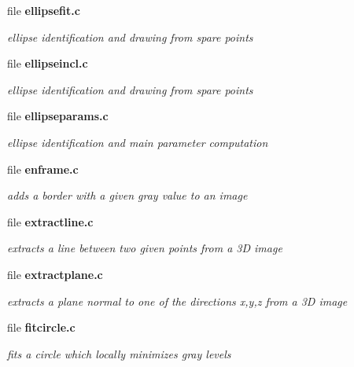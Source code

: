 \begin{CompactItemize}
\item 
file {\bf ellipsefit.c}
\begin{CompactList}\small\item\em ellipse identification and drawing from spare points \item\end{CompactList}

\item 
file {\bf ellipseincl.c}
\begin{CompactList}\small\item\em ellipse identification and drawing from spare points \item\end{CompactList}

\item 
file {\bf ellipseparams.c}
\begin{CompactList}\small\item\em ellipse identification and main parameter computation \item\end{CompactList}

\item 
file {\bf enframe.c}
\begin{CompactList}\small\item\em adds a border with a given gray value to an image \item\end{CompactList}

\item 
file {\bf extractline.c}
\begin{CompactList}\small\item\em extracts a line between two given points from a 3D image \item\end{CompactList}

\item 
file {\bf extractplane.c}
\begin{CompactList}\small\item\em extracts a plane normal to one of the directions x,y,z from a 3D image \item\end{CompactList}

\item 
file {\bf fitcircle.c}
\begin{CompactList}\small\item\em fits a circle which locally minimizes gray levels \item\end{CompactList}


\end{CompactItemize}
